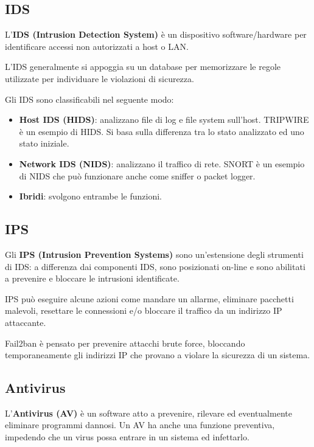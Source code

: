     \subsection{IDS}
        L'\textbf{IDS (Intrusion Detection System)} è un dispositivo software/hardware per identificare accessi non autorizzati a host o LAN.
    
        L'IDS generalmente si appoggia su un database per memorizzare le regole utilizzate per individuare le violazioni di sicurezza.
    
        Gli IDS sono classificabili nel seguente modo:
        \begin{itemize}
            \item \textbf{Host IDS (HIDS)}: analizzano file di log e file system sull'host. TRIPWIRE è un esempio di HIDS. Si basa sulla differenza tra lo stato analizzato ed uno stato iniziale.
            \item \textbf{Network IDS (NIDS)}: analizzano il traffico di rete.
            SNORT è un esempio di NIDS che può funzionare anche come sniffer o packet logger.
            \item \textbf{Ibridi}: svolgono entrambe le funzioni.
        \end{itemize}
    
    \subsection{IPS}
        Gli \textbf{IPS (Intrusion Prevention Systems)} sono un'estensione degli strumenti di IDS: a differenza dai componenti IDS, sono posizionati on-line e sono abilitati a prevenire e bloccare le intrusioni identificate.
    
        IPS può eseguire alcune azioni come mandare un allarme, eliminare pacchetti malevoli, resettare le connessioni e/o bloccare il traffico da un indirizzo IP attaccante.
    
        Fail2ban è pensato per prevenire attacchi brute force, bloccando temporaneamente gli indirizzi IP che provano a violare la sicurezza di un sistema.
    
    \subsection{Antivirus}
        L'\textbf{Antivirus (AV)} è un software atto a prevenire, rilevare ed eventualmente eliminare programmi dannosi. Un AV ha anche una funzione preventiva, impedendo che un virus possa entrare in un sistema ed infettarlo.
    
